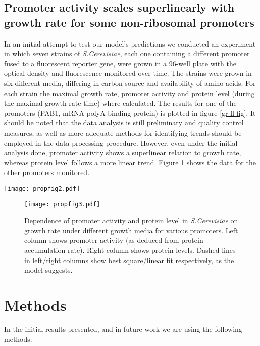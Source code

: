 \documentclass[a4page,notitlepage]{article}
\begin{document}
\subsection{Promoter activity scales superlinearly with growth rate for some non-ribosomal promoters}
\label{methods}
In an initial attempt to test our model's predictions we conducted an experiment in which seven strains of \emph{S.Cerevisiae}, each one containing a different promoter fused to a fluorescent reporter gene, were grown in a 96-well plate with the optical density and fluorescence monitored over time.
The strains were grown in six different media, differing in carbon source and availability of amino acids.
For each strain the maximal growth rate, promoter activity and protein level (during the maximal growth rate time) where calculated.
The results for one of the promoters (PAB1, mRNA polyA binding protein) is plotted in figure \ref{gr-fl-fig}.
It should be noted that the data analysis is still preliminary and quality control measures, as well as more adequate methods for identifying trends should be employed in the data processing procedure.
However, even under the initial analysis done, promoter activity shows a superlinear relation to growth rate, whereas protein level follows a more linear trend.
Figure \ref{gr-fl-mult} shows the data for the other promoters monitored.
\begin{SCfigure}
\caption{Dependence of promoter activity and protein level on growth rate for PAB1 (Poly(A) binding protein) promoter under different growth media.
(A) Protein level scales roughly like growth rate.
Dashed line shows best linear fit, as the model suggests.
(B) Promoter activity (as deduced by protein accumulation rate) exhibits a superlinear relation to growth rate.
Dashed line shows best square fit, as the model suggests.
}
\texttt{[image: propfig2.pdf]}
\label{gr-fl-fig}
\end{SCfigure}
\begin{figure}[h]
\texttt{[image: propfig3.pdf]}
\caption{Dependence of promoter activity and protein level in \emph{S.Cerevisiae} on growth rate under different growth media for various promoters.
Left column shows promoter activity (as deduced from protein accumulation rate).
Right column shows protein levels.
Dashed lines in left/right columns show best square/linear fit respectively, as the model suggests.
}
\label{gr-fl-mult}
\end{figure}
\section{Methods}
In the initial results presented, and in future work we are using the following methods:
\end{document}
